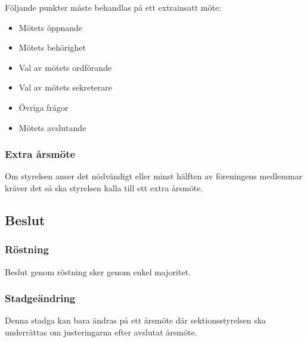 \documentclass[11pt, noincludeaddress]{classes/cthit}
\begin{document}
Följande punkter måste behandlas på ett extrainsatt möte:

\begin{itemize}
        \item Mötets öppnande
        \item Mötets behörighet
        \item Val av mötets ordförande
        \item Val av mötets sekreterare
        \item Övriga frågor
        \item Mötets avslutande
\end{itemize}

\subsubsection{Extra årsmöte}
Om styrelsen anser det nödvändigt eller minst hälften av föreningens medlemmar 
kräver det så ska styrelsen kalla till ett extra årsmöte.

\subsection{Beslut}

\subsubsection{Röstning}
Beslut genom röstning sker genom enkel majoritet.

\subsubsection{Stadgeändring}
Denna stadga kan bara ändras på ett årsmöte där sektionsstyrelsen ska underrättas om justeringarna efter avslutat årsmöte.
\end{document}
